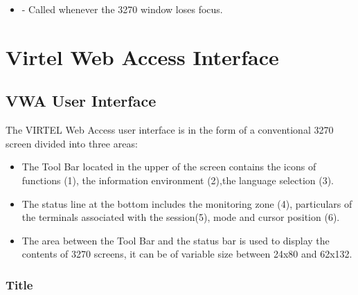 \documentclass[letterpaper,10pt,english]{sphinxmanual}
\begin{document}
\ignorespaces \begin{itemize}
\item {} 
 - Called whenever the 3270 window loses focus.

\end{itemize}


\chapter{Virtel Web Access Interface}
\label{\detokenize{Customization:virtel-web-access-interface}}
\ignorespaces 

\section{VWA User Interface}
\label{\detokenize{Customization:vwa-user-interface}}\label{\detokenize{Customization:index-14}}
The VIRTEL Web Access user interface is in the form of a conventional 3270 screen divided into three areas:
\begin{itemize}
\item {} 
The Tool Bar located in the upper of the screen contains the icons of functions (1), the information environment (2),the language selection (3).

\item {} 
The status line at the bottom includes the monitoring zone (4), particulars of the terminals associated with the session(5), mode and cursor position (6).

\item {} 
The area between the Tool Bar and the status bar is used to display the contents of 3270 screens, it can be of variable size between 24x80 and 62x132.

\end{itemize}



\subsection{Title}
\label{\detokenize{Customization:title}}
\ignorespaces 
\end{document}
